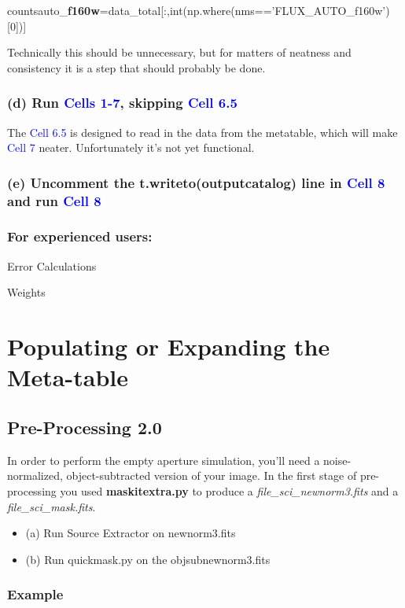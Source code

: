 \documentclass[a4paper,10pt]{article}
\begin{document}
\centerline{countsauto\_\textbf{f160w}=data\_total[:,int(np.where(nms=='FLUX\_AUTO\_f160w')[0])]}

\hfill \break
\noindent Technically this should be unnecessary, but for matters of neatness and consistency it is a step that should probably be done.

\subsubsection{(d) Run \textcolor{blue}{Cells 1-7}, skipping \textcolor{blue}{Cell 6.5}}

The \textcolor{blue}{Cell 6.5} is designed to read in the data from the metatable, which will make \textcolor{blue}{Cell 7} neater. Unfortunately it's not yet functional.

\subsubsection{(e) Uncomment the t.writeto(outputcatalog) line in \textcolor{blue}{Cell 8} and run \textcolor{blue}{Cell 8}}

\subsubsection*{For experienced users:}
Error Calculations

\noindent Weights


\section{Populating or Expanding the Meta-table}
\subsection{Pre-Processing 2.0}

In order to perform the empty aperture simulation, you'll need a noise-normalized, object-subtracted version of your image. In the first stage of pre-processing you used \textbf{maskitextra.py} to produce a \textit{file\_sci\_newnorm3.fits} and a \textit{file\_sci\_mask.fits}.
\begin{itemize}
 \item{(a)} Run Source Extractor on newnorm3.fits
 \item{(b)} Run quickmask.py on the objsubnewnorm3.fits
 \end{itemize}


\subsubsection*{Example}
\end{document}
